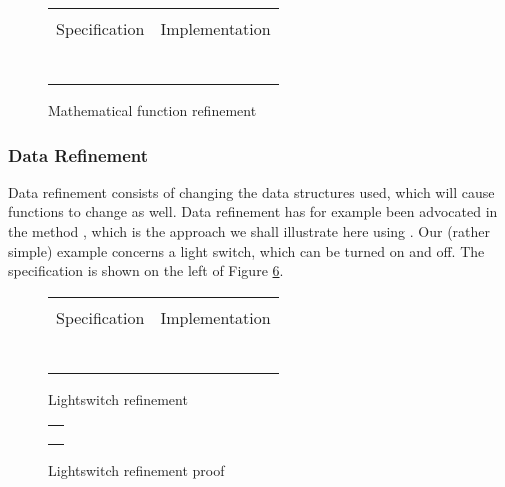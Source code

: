 \begin{figure}
  \centering
  \begin{tabular}[c]{c|c}
    \hline \\
    Specification & Implementation \\
    \hline\hline \\ \\
    \begin{subfigure}[c]{0.5\textwidth}
     
      \label{fig:prepost1}
    \end{subfigure}
    &
    \begin{subfigure}[c]{0.5\textwidth}
      
      \label{fig:prepost2}
    \end{subfigure}
    \\ \\
    \hline
  \end{tabular}    
  \caption{Mathematical function refinement}
  \label{fig:prepost}
\end{figure}

\subsubsection{Data Refinement}

Data refinement consists of changing the data structures used, which will
cause functions to change as well. Data refinement has for example been
advocated in the \vdm{} method \cite{vdm}, which is the approach we shall
illustrate here using \Klang. Our (rather simple) example concerns a light switch,
which can be turned on and off.  The specification is shown on the left of
Figure \ref{fig:lightswitch}.

\begin{figure}
  \centering
  \begin{tabular}[c]{c|c}
    \hline \\
    Specification & Implementation \\
    \hline\hline \\ \\
    \begin{subfigure}[c]{0.5\textwidth}
     
      \label{fig:lightswitch1}
    \end{subfigure}
    &
    \begin{subfigure}[c]{0.5\textwidth}
      
      \label{fig:lightswicth2}
    \end{subfigure}
    \\ \\
    \hline
  \end{tabular}    
  \caption{Lightswitch refinement}
  \label{fig:lightswitch}
\end{figure}

\begin{figure}
\centering
\begin{tabular}{c}
\hline \\
 \\ \\
\hline
\end{tabular}
\caption{Lightswitch refinement proof}
\label{fig:lightswitch3}
\end{figure}
